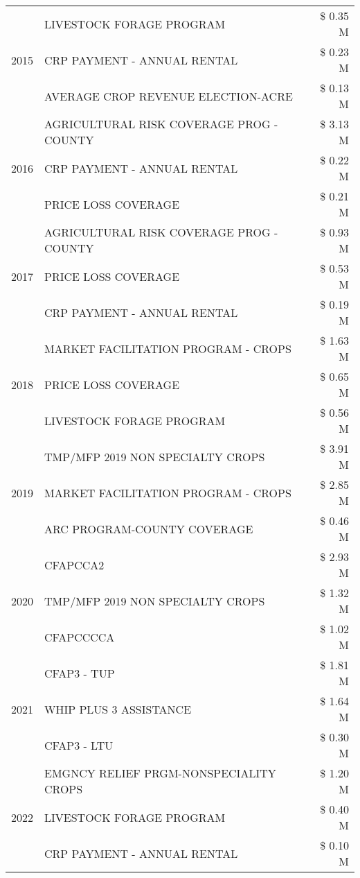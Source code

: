 \begin{tabular}{llr}
\cline{1-3}
\multirow[t]{3}{*}{2015} & LIVESTOCK FORAGE PROGRAM & \$ 0.35 M \\
 & CRP PAYMENT - ANNUAL RENTAL & \$ 0.23 M \\
 & AVERAGE CROP REVENUE ELECTION-ACRE & \$ 0.13 M \\
\cline{1-3}
\multirow[t]{3}{*}{2016} & AGRICULTURAL RISK COVERAGE PROG - COUNTY & \$ 3.13 M \\
 & CRP PAYMENT - ANNUAL RENTAL & \$ 0.22 M \\
 & PRICE LOSS COVERAGE & \$ 0.21 M \\
\cline{1-3}
\multirow[t]{3}{*}{2017} & AGRICULTURAL RISK COVERAGE PROG - COUNTY & \$ 0.93 M \\
 & PRICE LOSS COVERAGE & \$ 0.53 M \\
 & CRP PAYMENT - ANNUAL RENTAL & \$ 0.19 M \\
\cline{1-3}
\multirow[t]{3}{*}{2018} & MARKET FACILITATION PROGRAM - CROPS & \$ 1.63 M \\
 & PRICE LOSS COVERAGE & \$ 0.65 M \\
 & LIVESTOCK FORAGE PROGRAM & \$ 0.56 M \\
\cline{1-3}
\multirow[t]{3}{*}{2019} & TMP/MFP 2019 NON SPECIALTY CROPS & \$ 3.91 M \\
 & MARKET FACILITATION PROGRAM - CROPS & \$ 2.85 M \\
 & ARC PROGRAM-COUNTY COVERAGE & \$ 0.46 M \\
\cline{1-3}
\multirow[t]{3}{*}{2020} & CFAPCCA2 & \$ 2.93 M \\
 & TMP/MFP 2019 NON SPECIALTY CROPS & \$ 1.32 M \\
 & CFAPCCCCA & \$ 1.02 M \\
\cline{1-3}
\multirow[t]{3}{*}{2021} & CFAP3 - TUP & \$ 1.81 M \\
 & WHIP PLUS 3 ASSISTANCE & \$ 1.64 M \\
 & CFAP3 - LTU & \$ 0.30 M \\
\cline{1-3}
\multirow[t]{3}{*}{2022} & EMGNCY RELIEF PRGM-NONSPECIALITY CROPS & \$ 1.20 M \\
 & LIVESTOCK FORAGE PROGRAM & \$ 0.40 M \\
 & CRP PAYMENT - ANNUAL RENTAL & \$ 0.10 M \\
\cline{1-3}
\bottomrule
\end{tabular}
